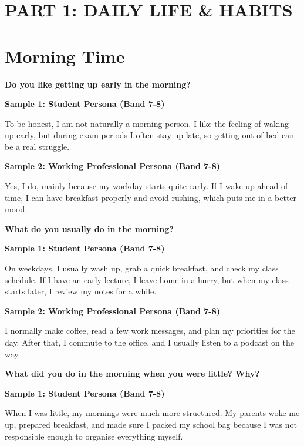 \newpage

\section*{PART 1: DAILY LIFE \& HABITS}

\section{Morning Time}
\begin{ieltsquestion}
\textbf{Do you like getting up early in the morning?}
\end{ieltsquestion}
\textbf{Sample 1: Student Persona (Band 7-8)}

To be honest, I am not naturally a morning person. I like the feeling of waking up early, but during exam periods I often stay up late, so getting out of bed can be a real struggle.

\textbf{Sample 2: Working Professional Persona (Band 7-8)}

Yes, I do, mainly because my workday starts quite early. If I wake up ahead of time, I can have breakfast properly and avoid rushing, which puts me in a better mood.

\separator

\begin{ieltsquestion}
\textbf{What do you usually do in the morning?}
\end{ieltsquestion}
\textbf{Sample 1: Student Persona (Band 7-8)}

On weekdays, I usually wash up, grab a quick breakfast, and check my class schedule. If I have an early lecture, I leave home in a hurry, but when my class starts later, I review my notes for a while.

\textbf{Sample 2: Working Professional Persona (Band 7-8)}

I normally make coffee, read a few work messages, and plan my priorities for the day. After that, I commute to the office, and I usually listen to a podcast on the way.

\separator

\begin{ieltsquestion}
\textbf{What did you do in the morning when you were little? Why?}
\end{ieltsquestion}
\textbf{Sample 1: Student Persona (Band 7-8)}

When I was little, my mornings were much more structured. My parents woke me up, prepared breakfast, and made sure I packed my school bag because I was not responsible enough to organise everything myself.

